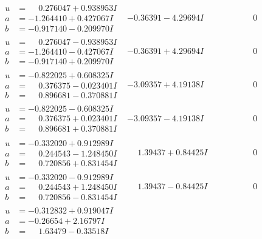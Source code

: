 \documentclass[1p]{elsarticle_modified}
\theoremstyle{definition}
\begin{document}
$$\begin{array}{c|c|c}
\begin{aligned}
u &= \phantom{-}0.276047 + 0.938953 I \\
a &= -1.264410 + 0.427067 I \\
b &= -0.917140 - 0.209970 I\end{aligned}
 & -0.36391 - 4.29694 I & \phantom{-0.000000 } 0 \\ \hline\begin{aligned}
u &= \phantom{-}0.276047 - 0.938953 I \\
a &= -1.264410 - 0.427067 I \\
b &= -0.917140 + 0.209970 I\end{aligned}
 & -0.36391 + 4.29694 I & \phantom{-0.000000 } 0 \\ \hline\begin{aligned}
u &= -0.822025 + 0.608325 I \\
a &= \phantom{-}0.376375 - 0.023401 I \\
b &= \phantom{-}0.896681 - 0.370881 I\end{aligned}
 & -3.09357 + 4.19138 I & \phantom{-0.000000 } 0 \\ \hline\begin{aligned}
u &= -0.822025 - 0.608325 I \\
a &= \phantom{-}0.376375 + 0.023401 I \\
b &= \phantom{-}0.896681 + 0.370881 I\end{aligned}
 & -3.09357 - 4.19138 I & \phantom{-0.000000 } 0 \\ \hline\begin{aligned}
u &= -0.332020 + 0.912989 I \\
a &= \phantom{-}0.244543 - 1.248450 I \\
b &= \phantom{-}0.720856 + 0.831454 I\end{aligned}
 & \phantom{-}1.39437 + 0.84425 I & \phantom{-0.000000 } 0 \\ \hline\begin{aligned}
u &= -0.332020 - 0.912989 I \\
a &= \phantom{-}0.244543 + 1.248450 I \\
b &= \phantom{-}0.720856 - 0.831454 I\end{aligned}
 & \phantom{-}1.39437 - 0.84425 I & \phantom{-0.000000 } 0 \\ \hline\begin{aligned}
u &= -0.312832 + 0.919047 I \\
a &= -0.26654 + 2.16797 I \\
b &= \phantom{-}1.63479 - 0.33518 I\end{aligned}

\end{array}$$
\end{document}

